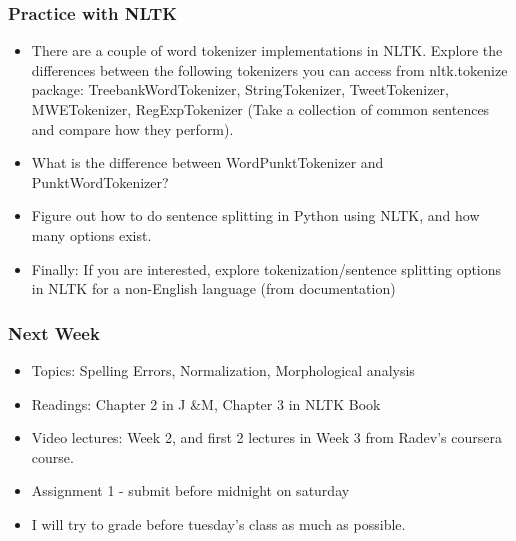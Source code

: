 \documentclass{beamer}
\begin{document}
\begin{frame}
\frametitle{Practice with NLTK}
\begin{itemize}
\item There are a couple of word tokenizer implementations in NLTK. Explore the differences between the following tokenizers you can access from nltk.tokenize package: TreebankWordTokenizer, StringTokenizer, TweetTokenizer, MWETokenizer, RegExpTokenizer (Take a collection of common sentences and compare how they perform).
\item What is the difference between WordPunktTokenizer and PunktWordTokenizer?
\item Figure out how to do sentence splitting in Python using NLTK, and how many options exist.
\item Finally: If you are interested, explore tokenization/sentence splitting options in NLTK for a non-English language (from documentation)
\end{itemize}
\end{frame}

\begin{frame}
\frametitle{Next Week}
\begin{itemize}
\item Topics: Spelling Errors, Normalization, Morphological analysis
\item Readings: Chapter 2 in J \&M, Chapter 3 in NLTK Book
\item Video lectures: Week 2, and first 2 lectures in Week 3 from Radev's coursera course.
\item Assignment 1 - submit before midnight on saturday
\item I will try to grade before tuesday's class as much as possible.
\end{itemize}
\end{frame}
\end{document}
